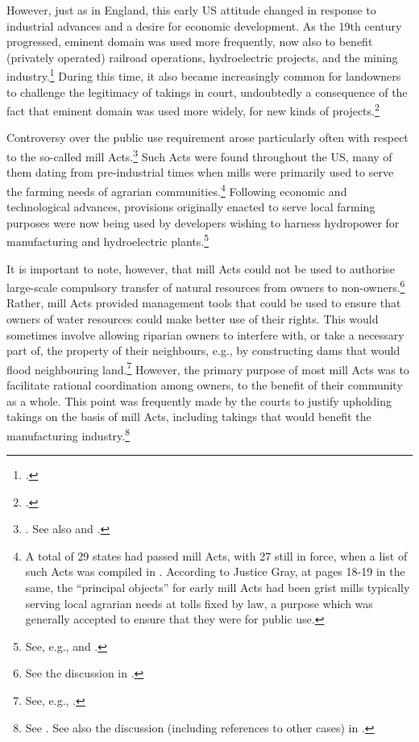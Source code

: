 However, just as in England, this early US attitude changed in response to industrial advances and a desire for economic development. As the 19th century progressed, eminent domain was used more frequently, now also to benefit (privately operated) railroad operations, hydroelectric projects, and the mining industry.\footcite[23-33]{meidinger80} During this time, it also became increasingly common for landowners to challenge the legitimacy of takings in court, undoubtedly a consequence of the fact that eminent domain was used more widely, for new kinds of projects.\footcite[24]{meidinger80} 

Controversy over the public use requirement arose particularly often with respect to the so-called mill Acts.\footnote{\cite[24]{meidinger80}. See also \cite[306-313]{johnson11} and \cite[251-252]{horwitz73}.} Such Acts were found throughout the US, many of them dating from pre-industrial times when mills were primarily used to serve the farming needs of agrarian communities.\footnote{A total of 29 states had passed mill Acts, with 27 still in force, when a list of such Acts was compiled in \cite[17]{head85}. According to Justice Gray, at pages 18-19 in the same, the ``principal objects'' for early mill Acts had been grist mills typically serving local agrarian needs at tolls fixed by law, a purpose which was generally accepted to ensure that they were for public use.} Following economic and technological advances, provisions originally enacted to serve local farming purposes were now being used by developers wishing to harness hydropower for manufacturing and hydroelectric plants.\footnote{See, e.g., \cite[18-21]{head85} and \cite[449-452]{minn06}.}

It is important to note, however, that mill Acts could not be used to authorise large-scale compulsory transfer of natural resources from owners to non-owners.\footnote{See the discussion in \cite{head85}.} Rather, mill Acts provided management tools that could be used to ensure that owners of water resources could make better use of their rights. This would sometimes involve allowing riparian owners to interfere with, or take a necessary part of, the property of their neighbours, e.g., by constructing dams that would flood neighbouring land.\footnote{See, e.g., \cite[265]{staples03}.} However, the primary purpose of most mill Acts was to facilitate rational coordination among owners, to the benefit of their community as a whole. This point was frequently made by the courts to justify upholding takings on the basis of mill Acts, including takings that would benefit the manufacturing industry.\footnote{See \cite{fiske31}. See also the discussion (including references to other cases) in \cite{head85}.}

